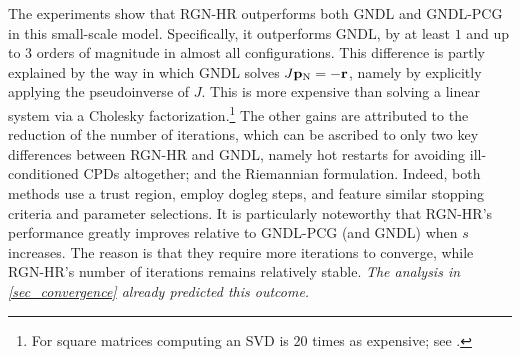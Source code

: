 \documentclass[a4paper,10pt,final]{siamart1116}
\newcommand{\vect}[1]{\mathbf{#1}}
\newcommand{\refsec}[1]{{\cref{#1}}}
\numberwithin{equation}{section}
\numberwithin{figure}{section}
\numberwithin{table}{section}
\numberwithin{theorem}{section}
\begin{document}
The experiments show that RGN-HR outperforms both GNDL and GNDL-PCG in this small-scale model. Specifically, it outperforms GNDL, by at least $1$ and up to $3$ orders of magnitude in almost all configurations.
This difference is partly explained by the way in which GNDL solves $J \vect{p}_{\text N} = -\vect{r}$, namely by explicitly applying the pseudoinverse of $J$. This is more expensive than solving a linear system via a Cholesky factorization.\footnote{For square matrices computing an SVD is $20$ times as expensive; see \cite[p. 78 and p. 239--240]{ANLA}.} The other gains are attributed to the reduction of the number of iterations, which can be ascribed to only two key differences between RGN-HR and GNDL, namely hot restarts for avoiding ill-conditioned CPDs altogether; and the Riemannian formulation.
Indeed, both methods use a trust region, employ dogleg steps, and feature similar stopping criteria and parameter selections.
It is particularly noteworthy that RGN-HR's performance greatly improves relative to GNDL-PCG (and GNDL) when $s$ increases. The reason is that they require more iterations to converge, while RGN-HR's number of iterations remains relatively stable. \emph{The analysis in \refsec{sec_convergence} already predicted this outcome.}%
\end{document}
